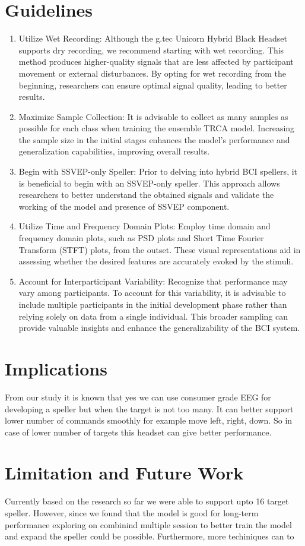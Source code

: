 \section{Guidelines}  
\begin{enumerate}
    \item Utilize Wet Recording: Although the g.tec Unicorn Hybrid Black Headset supports dry recording, we recommend starting with wet recording. This method produces higher-quality signals that are less affected by participant movement or external disturbances. By opting for wet recording from the beginning, researchers can ensure optimal signal quality, leading to better results.
    \item Maximize Sample Collection: It is advisable to collect as many samples as possible for each class when training the ensemble TRCA model. Increasing the sample size in the initial stages enhances the model's performance and generalization capabilities, improving overall results.
    \item Begin with SSVEP-only Speller: Prior to delving into hybrid BCI spellers, it is beneficial to begin with an SSVEP-only speller. This approach allows researchers to better understand the obtained signals and validate the working of the model and presence of SSVEP component.
    \item Utilize Time and Frequency Domain Plots: Employ time domain and frequency domain plots, such as PSD plots and Short Time Fourier Transform (STFT) plots, from the outset. These visual representations aid in assessing whether the desired features are accurately evoked by the stimuli.
    \item Account for Interparticipant Variability: Recognize that performance may vary among participants. To account for this variability, it is advisable to include multiple participants in the initial development phase rather than relying solely on data from a single individual. This broader sampling can provide valuable insights and enhance the generalizability of the BCI system.
\end{enumerate}

\section{Implications}

From our study it is known that yes we can use consumer grade EEG for developing a speller but when the target is not too many. It can better support lower number of commands smoothly for example move left, right, down. So in case of lower number of targets this headset can give better performance.

\section{Limitation and Future Work}

Currently based on the research so far we were able to support upto 16 target speller. However, since we found that the model is good for long-term performance exploring on combinind multiple session to better train the model and expand the speller could be possible. Furthermore, more techiniques can to 
